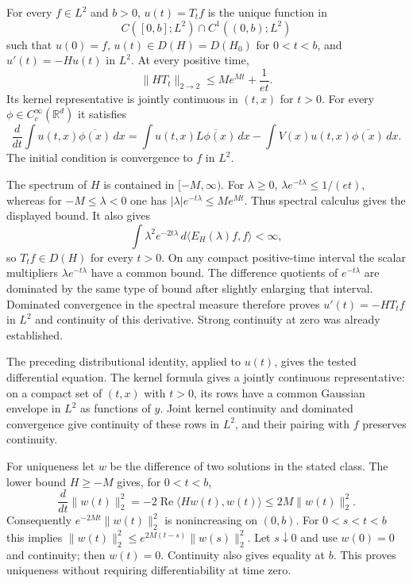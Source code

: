 \begin{proposition}
\label{prop:schrodinger_heat_solution}
For every $f\in L^2$ and $b>0$, $u(t)=T_tf$ is the unique function in
\[
C([0,b];L^2)\cap C^1((0,b);L^2)
\]
such that $u(0)=f$, $u(t)\in D(H)=D(H_0)$ for $0<t<b$, and
$u'(t)=-Hu(t)$ in $L^2$. At every positive time,
\[
\|HT_t\|_{2\to2}\leq Me^{Mt}+\frac1{et}.
\]
Its kernel representative is jointly continuous in $(t,x)$ for $t>0$.
For every $\phi\in C_c^\infty(\mathbb R^d)$ it satisfies
\[
\frac{d}{dt}\int u(t,x)\overline{\phi(x)}\,dx
=\int u(t,x)\overline{L\phi(x)}\,dx
 -\int V(x)u(t,x)\overline{\phi(x)}\,dx.
\]
The initial condition is convergence to $f$ in $L^2$.
\end{proposition}
\Proof
The spectrum of $H$ is contained in $[-M,\infty)$. For $\lambda\geq0$,
$\lambda e^{-t\lambda}\leq1/(et)$, whereas for
$-M\leq\lambda<0$ one has
$|\lambda|e^{-t\lambda}\leq Me^{Mt}$. Thus spectral calculus gives
the displayed bound. It also gives
\[
\int\lambda^2e^{-2t\lambda}\,
             d\langle E_H(\lambda)f,f\rangle<\infty,
\]
so $T_tf\in D(H)$ for every $t>0$.
On any compact positive-time interval the scalar multipliers
$\lambda e^{-t\lambda}$ have a common bound. The difference quotients
of $e^{-t\lambda}$ are dominated by the same type of bound after
slightly enlarging that interval. Dominated convergence in the spectral
measure therefore proves $u'(t)=-HT_tf$ in $L^2$ and continuity of this
derivative. Strong continuity at zero was already established.

The preceding distributional identity, applied to $u(t)$, gives the
tested differential equation. The kernel formula gives a jointly
continuous representative: on a compact set of $(t,x)$ with $t>0$,
its rows have a common Gaussian envelope in $L^2$ as functions of $y$.
Joint kernel continuity and dominated convergence give continuity of
these rows in $L^2$, and their pairing with $f$ preserves continuity.

For uniqueness let $w$ be the difference of two solutions in the
stated class. The lower bound $H\geq-M$ gives, for $0<t<b$,
\[
\frac{d}{dt}\|w(t)\|_2^2
=-2\operatorname{Re}\langle Hw(t),w(t)\rangle
\leq2M\|w(t)\|_2^2.
\]
Consequently $e^{-2Mt}\|w(t)\|_2^2$ is nonincreasing on $(0,b)$.
For $0<s<t<b$ this implies
$\|w(t)\|_2^2\leq e^{2M(t-s)}\|w(s)\|_2^2$.
Let $s\downarrow0$ and use $w(0)=0$ and continuity; then $w(t)=0$.
Continuity also gives equality at $b$. This proves uniqueness without
requiring differentiability at time zero.
\Done

